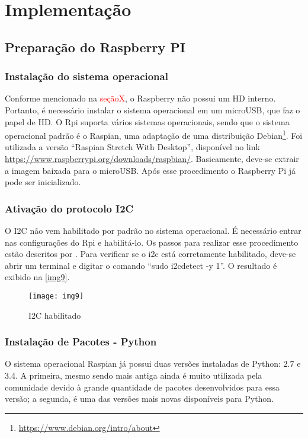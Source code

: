 \chapter{Implementação}			
	
		
	\section{Preparação do Raspberry PI}
		\subsection{Instalação do sistema operacional}
			Conforme mencionado na \textcolor{red}{seçãoX}, o Raspberry não possui um HD interno. Portanto, é necessário instalar o sistema operacional em um microUSB, que faz o papel de HD. O Rpi suporta vários sistemas operacionais, sendo que o sistema operacional padrão é o Raspian, uma adaptação de uma distribuição Debian\footnote{\url{https://www.debian.org/intro/about}}. Foi utilizada a versão ``Raspian Stretch With Desktop'', disponível no link \url{https://www.raspberrypi.org/downloads/raspbian/}. Basicamente, deve-se extrair a imagem baixada para o microUSB. Após esse procedimento o Raspberry Pi já pode ser inicializado.
		
		\subsection{Ativação do protocolo I2C}
			O I2C não vem habilitado por padrão no sistema operacional. É necessário entrar nas configurações do Rpi e habilitá-lo. Os passos para realizar esse procedimento estão descritos por \textcite{matt2014}. Para verificar se o i2c está corretamente habilitado, deve-se abrir um terminal e digitar o comando ``sudo i2cdetect -y 1''. O resultado é exibido na \autoref{img9}.
			
			\begin{figure}[!htb]	
				\captionsetup{justification=centering}
				\begin{center}
					\texttt{[image: img9]}  %
					\caption[I2C habilitado]{\label{img9}I2C habilitado}
				\end{center}		
			\end{figure}
		
		\subsection{Instalação de Pacotes - Python}
			O sistema operacional Raspian já possui duas versões instaladas de Python: 2.7 e 3.4. A primeira, mesmo sendo mais antiga ainda é muito utilizada pela comunidade devido à grande quantidade de pacotes desenvolvidos para essa versão; a segunda, é uma das versões mais novas disponíveis para Python.
			
